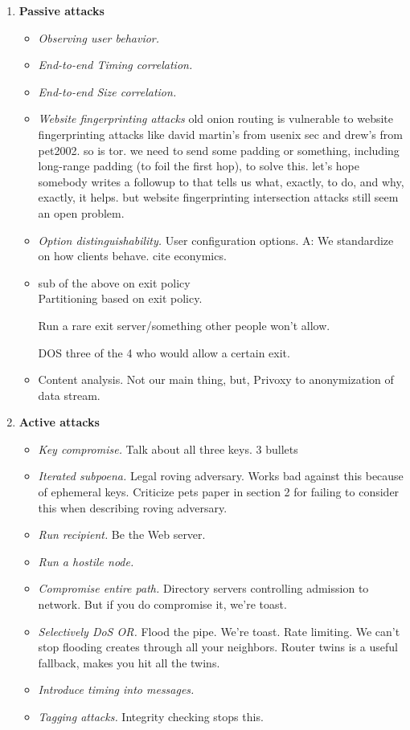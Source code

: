 \documentclass[times,10pt,twocolumn]{article}
\begin{document}
\begin{enumerate}
\item \textbf{Passive attacks}
\begin{itemize}
\item \emph{Observing user behavior.}
\item \emph{End-to-end Timing correlation.}
\item \emph{End-to-end Size correlation.}
\item \emph{Website fingerprinting attacks} old onion routing is
vulnerable to website fingerprinting attacks like david martin's
from usenix sec and drew's from pet2002. so is tor. we need to send
some padding or something, including long-range padding (to foil the
first hop), to solve this. let's hope somebody writes a followup to
\cite{defensive-dropping} that tells us what, exactly, to do, and why,
exactly, it helps. but website fingerprinting intersection attacks
\cite{dogan:pet2002} still seem an open problem.

\item \emph{Option distinguishability.} User configuration options.
A: We standardize on how clients behave. cite econymics.

\item sub of the above on exit policy\\
Partitioning based on exit policy.

Run a rare exit server/something other people won't allow.

DOS three of the 4 who would allow a certain exit.

\item Content analysis. Not our main thing, but, Privoxy to
  anonymization of data stream.


\end{itemize}

\item \textbf{Active attacks}
\begin{itemize}
\item \emph{Key compromise.} Talk about all three keys. 3 bullets
\item \emph{Iterated subpoena.} Legal roving adversary. Works bad against
this because of ephemeral keys. Criticize pets paper in section 2 for
failing to consider this when describing roving adversary.
\item \emph{Run recipient.} Be the Web server.
\item \emph{Run a hostile node.} 
\item \emph{Compromise entire path.} Directory servers controlling admission
to network. But if you do compromise it, we're toast.
\item \emph{Selectively DoS OR.} Flood the pipe. We're toast. Rate limiting.
We can't stop flooding creates through all your neighbors. Router twins
is a useful fallback, makes you hit all the twins.
\item \emph{Introduce timing into messages.}
\item \emph{Tagging attacks.}
Integrity checking stops this.


\end{itemize}
\end{enumerate}
\end{document}
